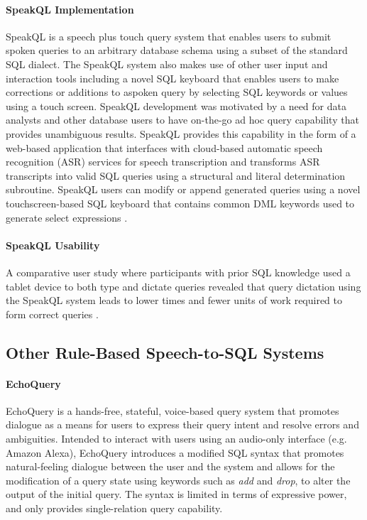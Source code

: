 \paragraph{SpeakQL Implementation} 

SpeakQL is a speech plus touch query system that enables users to submit spoken queries to an arbitrary database schema using a subset of the standard SQL dialect. The SpeakQL system also makes use of other user input and interaction tools including a novel SQL keyboard that enables users to make corrections or additions to aspoken query by selecting SQL keywords or values using a touch screen. SpeakQL development was motivated by a need for data analysts and other database users to have on-the-go ad hoc query capability that provides unambiguous results. SpeakQL provides this capability in the form of a web-based application that interfaces with cloud-based automatic speech recognition (ASR) services for speech transcription and transforms ASR transcripts into valid SQL queries using a structural and literal determination subroutine. SpeakQL users can modify or append generated queries using a novel touchscreen-based SQL keyboard that contains common DML keywords used to generate select expressions \cite{Shah2020, Shah2020tr}.

\paragraph{SpeakQL Usability}

A comparative user study where participants with prior SQL knowledge used a tablet device to both type and dictate queries revealed that query dictation using the SpeakQL system leads to lower times and fewer units of work required to form correct queries \cite{Shah2020, Shah2020tr}.

\subsection{Other Rule-Based Speech-to-SQL Systems}

\paragraph{EchoQuery} 

EchoQuery is a hands-free, stateful, voice-based query system that promotes dialogue as a means for users to express their query intent and resolve errors and ambiguities. Intended to interact with users using an audio-only interface (e.g. Amazon Alexa), EchoQuery introduces a modified SQL syntax that promotes natural-feeling dialogue between the user and the system and allows for the modification of a query state using keywords such as \emph{add} and \emph{drop}, to alter the output of the initial query. The syntax is limited in terms of expressive power, and only provides single-relation query capability.\cite{Lyons2016} 


